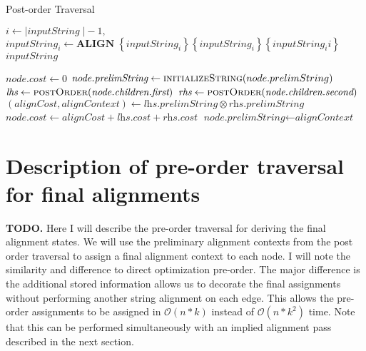 \documentclass[11pt]{article}
\begin{document}
\begin{algorithm}
  \caption{Post-order Traversal}\label{postOrder}
  \begin{algorithmic}[1]
      \State $i \gets \vert\textit{inputString} \;\vert - 1,$
        \State $\textit{inputString}_i \gets \textbf{ALIGN} \; \left\{ \textit{inputString}_i\right\} \left\{ \textit{inputString}_i \right\} \left\{ \textit{inputString}_ii \right\}$
      \EndWhile 
      \Return $\textit{inputString}$
    \EndFunction 
        
        \State $\textit{node.cost} \gets 0$
          \State $\textit{node.prelimString} \gets \Call{initializeString}{node.prelimString}$
        \EndIf
      \Else
        \State $\textit{lhs}  \gets \Call{postOrder}{\textit{node.children.first}}$
        \State $\textit{rhs}  \gets \Call{postOrder}{\textit{node.children.second}}$
        \State $\left(\textit{alignCost}, \textit{alignContext}\right) \gets \textit{lhs.prelimString} \otimes \textit{rhs.prelimString}$
        \State $\textit{node.cost} \gets \textit{alignCost} + \textit{lhs.cost} + \textit{rhs.cost}$
        \State $\textit{node.prelimString} \gets \textit{alignContext}$
      \EndIf
    \EndFunction
  \end{algorithmic}
\end{algorithm}


\section{Description of pre-order traversal for final alignments}
\textbf{TODO.}
Here I will describe the pre-order traversal for deriving the final alignment states. 
We will use the preliminary alignment contexts from the post order traversal to assign a final alignment context to each node. 
I will note the similarity and difference to direct optimization pre-order. 
The major difference is the additional stored information allows us to decorate the final assignments without performing another string alignment on each edge.
This allows the pre-order assignments to be assigned in $\mathcal{O}(n*k)$ instead of $\mathcal{O}(n*k^2)$ time.
Note that this can be performed simultaneously with an implied alignment pass described in the next section.
\end{document}
